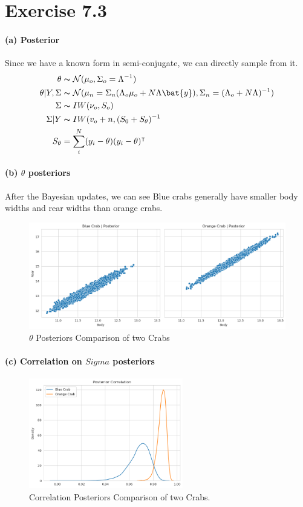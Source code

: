 \documentclass[11pt, letterpaper]{article}
\begin{document}
\section{Exercise 7.3}
\paragraph{(a) Posterior}
Since we have a known form in semi-conjugate, we can directly sample from it.
\begin{align*}
    \theta &\thicksim \mathcal{N}(\mu_o, \Sigma_o = \Lambda^{-1}) \\
    \theta|Y, \Sigma &\thicksim \mathcal{N}(
        \mu_n = \Sigma_n(\Lambda_o\mu_o+N\Lambda\bat{y}),
        \Sigma_n = (\Lambda_o + N\Lambda)^{-1}
    ) \\
    \Sigma &\thicksim IW(\nu_o, S_o) \\ 
    \Sigma|Y &\thicksim IW(v_o + n, (S_0+S_{\theta})^{-1} \\
    S_{\theta} &= \sum_i^N (y_i - \theta)(y_i - \theta)^{\intercal}
\end{align*}

\paragraph{(b) $\theta$ posteriors}
After the Bayesian updates, we can see Blue crabs generally have smaller body widths and rear widths than orange crabs.
\begin{figure}[!h]
  \centering
  \includegraphics[width=1.0\textwidth]{3.1.png}
  \captionsetup{justification=centering}
  \caption{$\theta$ Posteriors Comparison of two Crabs}
\end{figure}

\paragraph{(c) Correlation on $Sigma$ posteriors}
\begin{figure}[!h]
  \centering
  \includegraphics[width=0.6\textwidth]{3.2.png}
  \captionsetup{justification=centering}
  \caption{Correlation Posteriors Comparison of two Crabs. }
\end{figure}
\end{document}
